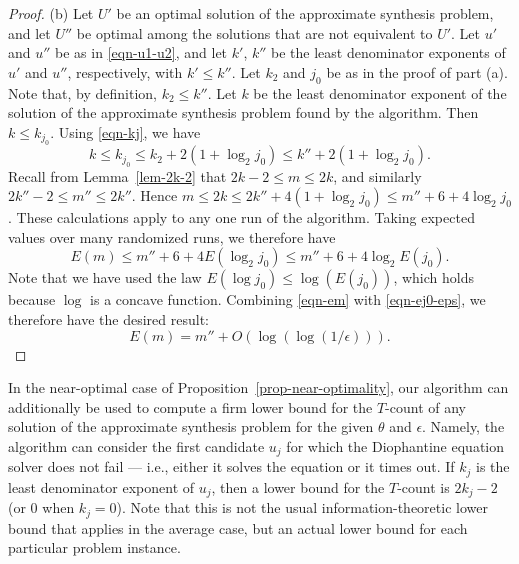 \documentclass{article}
\begin{document}
\begin{proof}
  (b) Let $U'$ be an optimal solution of the approximate synthesis
  problem, and let $U''$ be optimal among the solutions that are not
  equivalent to $U'$. Let $u'$ and $u''$ be as in {\eqref{eqn-u1-u2}},
  and let $k'$, $k''$ be the least denominator exponents of $u'$ and
  $u''$, respectively, with $k'\leq k''$. Let $k_2$ and $j_0$ be as in
  the proof of part (a). Note that, by definition, $k_2\leq k''$. Let
  $k$ be the least denominator exponent of the solution of the
  approximate synthesis problem found by the algorithm. Then $k\leq
  k_{j_0}$.  Using {\eqref{eqn-kj}}, we have
  \[ k \leq k_{j_0} \leq k_2 + 2(1+\log_2 j_0) \leq k'' +  2(1+\log_2 j_0).
  \]
  Recall from Lemma~\ref{lem-2k-2} that $2k-2 \leq m \leq 2k$, and
  similarly $2k''-2\leq m''\leq 2k''$. Hence $m \leq 2k\leq
  2k''+4(1+\log_2 j_0)\leq m'' + 6 + 4\log_2
  j_0$. These calculations apply to any one run of the
  algorithm. Taking expected values over many randomized runs, we
  therefore have
  \begin{equation}\label{eqn-em}
    E(m) \leq m'' + 6 + 4 E(\log_2 j_0) 
    \leq m'' + 6 + 4\log_2 E(j_0).
  \end{equation}
  Note that we have used the law $E(\log j_0)\leq \log(E(j_0))$, which
  holds because $\log$ is a concave function. Combining {\eqref{eqn-em}}
  with {\eqref{eqn-ej0-eps}}, we therefore have the desired result:
  \begin{equation}
    E(m) = m'' + O(\log(\log(1/\epsilon))).
  \end{equation}
\end{proof}

\begin{remark}\label{rem-lower-bound}
  In the near-optimal case of Proposition~\ref{prop-near-optimality},
  our algorithm can additionally be used to compute a firm lower bound
  for the $T$-count of any solution of the approximate synthesis
  problem for the given $\theta$ and $\epsilon$. Namely, the algorithm
  can consider the first candidate $u_j$ for which the Diophantine
  equation solver does not fail --- i.e., either it solves the
  equation or it times out. If $k_j$ is the least denominator exponent
  of $u_j$, then a lower bound for the $T$-count is $2k_j-2$ (or $0$
  when $k_j=0$).  Note that this is not the usual
  information-theoretic lower bound that applies in the average case,
  but an actual lower bound for each particular problem instance.
\end{remark}

\end{document}
